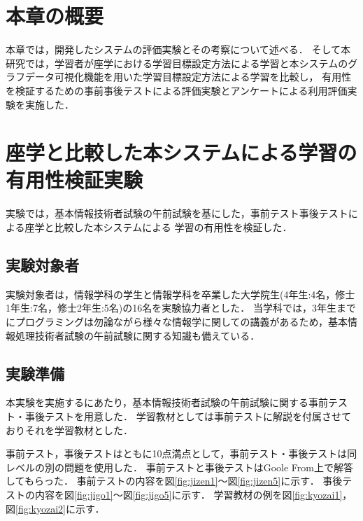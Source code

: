 \section{本章の概要}
本章では，開発したシステムの評価実験とその考察について述べる．
そして本研究では，学習者が座学における学習目標設定方法による学習と本システムのグラフデータ可視化機能を用いた学習目標設定方法による学習を比較し，
有用性を検証するための事前事後テストによる評価実験とアンケートによる利用評価実験を実施した．

\section{座学と比較した本システムによる学習の有用性検証実験}
実験では，基本情報技術者試験の午前試験を基にした，事前テスト事後テストによる座学と比較した本システムによる
学習の有用性を検証した．

\subsection{実験対象者}
実験対象者は，情報学科の学生と情報学科を卒業した大学院生(4年生:4名，修士1年生:7名，修士2年生:5名)の16名を実験協力者とした．
当学科では，3年生までにプログラミングは勿論ながら様々な情報学に関しての講義があるため，基本情報処理技術者試験の午前試験に関する知識も備えている．

\subsection{実験準備}
本実験を実施するにあたり，基本情報技術者試験の午前試験に関する事前テスト・事後テストを用意した．
学習教材としては事前テストに解説を付属させておりそれを学習教材とした．

事前テスト，事後テストはともに10点満点として，事前テスト・事後テストは同レベルの別の問題を使用した．
事前テストと事後テストはGoole From上で解答してもらった．
事前テストの内容を図\ref{fig:jizen1}～図\ref{fig:jizen5}に示す．
事後テストの内容を図\ref{fig:jigo1}～図\ref{fig:jigo5}に示す．
学習教材の例を図\ref{fig:kyozai1}，図\ref{fig:kyozai2}に示す．
